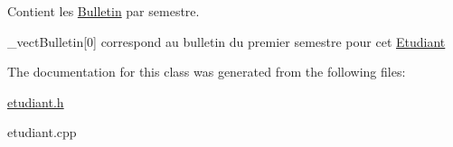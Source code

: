 Contient les \hyperlink{class_bulletin}{Bulletin} par semestre. 

\-\_\-vect\-Bulletin\mbox{[}0\mbox{]} correspond au bulletin du premier semestre pour cet \hyperlink{class_etudiant}{Etudiant} 

The documentation for this class was generated from the following files\-:\begin{DoxyCompactItemize}
\item 
\hyperlink{etudiant_8h}{etudiant.\-h}\item 
etudiant.\-cpp\end{DoxyCompactItemize}
